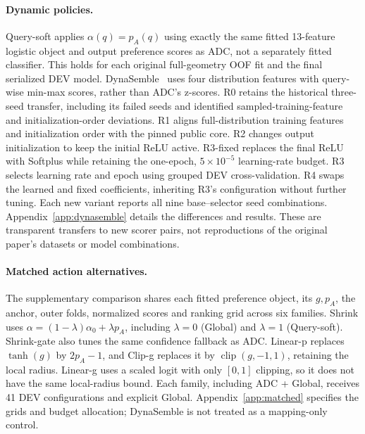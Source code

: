 \documentclass[11pt,a4paper]{article}
\newcommand{\clip}{\operatorname{clip}}
\begin{document}
\paragraph{Dynamic policies.}
Query-soft applies $\alpha(q)=p_A(q)$ using exactly the same fitted 13-feature logistic object and output preference scores as ADC, not a separately fitted classifier. This holds for each original full-geometry OOF fit and the final serialized DEV model. DynaSemble~\citep{dynasemble} uses four distribution features with query-wise min-max scores, rather than ADC's z-scores. R0 retains the historical three-seed transfer, including its failed seeds and identified sampled-training-feature and initialization-order deviations. R1 aligns full-distribution training features and initialization order with the pinned public core. R2 changes output initialization to keep the initial ReLU active. R3-fixed replaces the final ReLU with Softplus while retaining the one-epoch, $5\times10^{-5}$ learning-rate budget. R3 selects learning rate and epoch using grouped DEV cross-validation. R4 swaps the learned and fixed coefficients, inheriting R3's configuration without further tuning. Each new variant reports all nine base--selector seed combinations. Appendix~\ref{app:dynasemble} details the differences and results. These are transparent transfers to new scorer pairs, not reproductions of the original paper's datasets or model combinations.

\paragraph{Matched action alternatives.}
The supplementary comparison shares each fitted preference object, its $g,p_A$, the anchor, outer folds, normalized scores and ranking grid across six families. Shrink uses $\alpha=(1-\lambda)\alpha_0+\lambda p_A$, including $\lambda=0$ (Global) and $\lambda=1$ (Query-soft). Shrink-gate also tunes the same confidence fallback as ADC. Linear-p replaces $\tanh(g)$ by $2p_A-1$, and Clip-g replaces it by $\clip(g,-1,1)$, retaining the local radius. Linear-g uses a scaled logit with only $[0,1]$ clipping, so it does not have the same local-radius bound. Each family, including ADC + Global, receives 41 DEV configurations and explicit Global. Appendix~\ref{app:matched} specifies the grids and budget allocation; DynaSemble is not treated as a mapping-only control.
\end{document}
